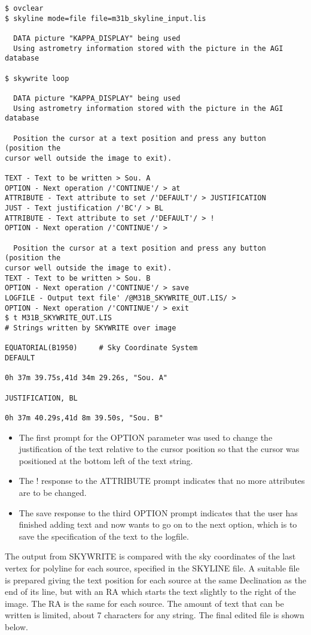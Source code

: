 \documentclass[twoside,11pt]{article}
\begin{document}
\begin{small}
\begin{verbatim}
$ ovclear
$ skyline mode=file file=m31b_skyline_input.lis

  DATA picture "KAPPA_DISPLAY" being used
  Using astrometry information stored with the picture in the AGI database

$ skywrite loop 

  DATA picture "KAPPA_DISPLAY" being used
  Using astrometry information stored with the picture in the AGI database

  Position the cursor at a text position and press any button (position the
cursor well outside the image to exit).

TEXT - Text to be written > Sou. A
OPTION - Next operation /'CONTINUE'/ > at
ATTRIBUTE - Text attribute to set /'DEFAULT'/ > JUSTIFICATION
JUST - Text justification /'BC'/ > BL
ATTRIBUTE - Text attribute to set /'DEFAULT'/ > !
OPTION - Next operation /'CONTINUE'/ > 

  Position the cursor at a text position and press any button (position the
cursor well outside the image to exit).
TEXT - Text to be written > Sou. B
OPTION - Next operation /'CONTINUE'/ > save
LOGFILE - Output text file' /@M31B_SKYWRITE_OUT.LIS/ > 
OPTION - Next operation /'CONTINUE'/ > exit
$ t M31B_SKYWRITE_OUT.LIS
# Strings written by SKYWRITE over image
 
EQUATORIAL(B1950)     # Sky Coordinate System
DEFAULT
 
0h 37m 39.75s,41d 34m 29.26s, "Sou. A"
 
JUSTIFICATION, BL
 
0h 37m 40.29s,41d 8m 39.50s, "Sou. B"
\end{verbatim}
\end{small}
\begin{itemize}
\item The first prompt for the OPTION parameter was used to change the
justification of the text relative to the cursor position so that the cursor
was positioned at the bottom left of the text string.
\item The ! response to the ATTRIBUTE prompt indicates that no more attributes
are to be changed.
\item The save response to the third OPTION prompt indicates that the user has
finished adding text and now wants to go on to the next option, which is to save
the specification of the text to the logfile.
\end{itemize}
The output from SKYWRITE is compared with the sky coordinates of the last
vertex for polyline for each source, specified in the SKYLINE file. A suitable
file is prepared giving the text position for each source at the same
Declination as the end of its line, but with an RA which starts the text
slightly to the right of the image. The RA is the same for each source. The
amount of text that can be written is limited, about 7  characters for any
string. The final edited file is shown below.
\end{document}
